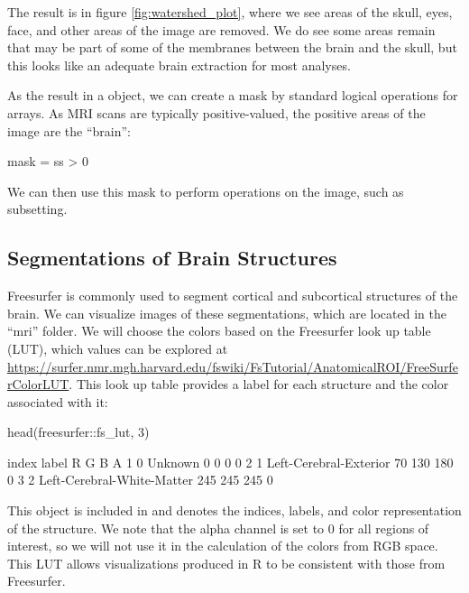 The result is in figure \ref{fig:watershed_plot}, where we see areas of
the skull, eyes, face, and other areas of the image are removed. We do
see some areas remain that may be part of some of the membranes between
the brain and the skull, but this looks like an adequate brain
extraction for most analyses.

As the result in a  object, we can create a mask by standard
logical operations for arrays. As MRI scans are typically
positive-valued, the positive areas of the image are the ``brain'':

\begin{Schunk}
\begin{Sinput}
mask = ss > 0
\end{Sinput}
\end{Schunk}

We can then use this mask to perform operations on the image, such as
subsetting.

\subsection{Segmentations of Brain
Structures}\label{segmentations-of-brain-structures}

Freesurfer is commonly used to segment cortical and subcortical
structures of the brain. We can visualize images of these segmentations,
which are located in the ``mri'' folder. We will choose the colors based
on the Freesurfer look up table (LUT), which values can be explored at
\url{https://surfer.nmr.mgh.harvard.edu/fswiki/FsTutorial/AnatomicalROI/FreeSurferColorLUT}.
This look up table provides a label for each structure and the color
associated with it:

\begin{Schunk}
\begin{Sinput}
head(freesurfer::fs_lut, 3)
\end{Sinput}
\begin{Soutput}
  index                      label   R   G   B A
1     0                    Unknown   0   0   0 0
2     1     Left-Cerebral-Exterior  70 130 180 0
3     2 Left-Cerebral-White-Matter 245 245 245 0
\end{Soutput}
\end{Schunk}

This object is included in  and denotes the indices,
labels, and color representation of the structure. We note that the
alpha channel is set to \(0\) for all regions of interest, so we will
not use it in the calculation of the colors from RGB space. This LUT
allows visualizations produced in R to be consistent with those from
Freesurfer.\\

